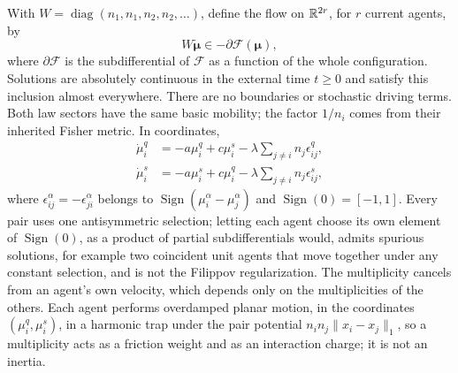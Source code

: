 With $W=\operatorname{diag}(n_1,n_1,n_2,n_2,\ldots)$, define the flow on
$\mathbb R^{2r}$, for $r$ current agents, by
\begin{equation}
 W\dot{\boldsymbol\mu}\in-\partial\mathcal F(\boldsymbol\mu),
 \label{fus:inclusion}
\end{equation}
where $\partial\mathcal F$ is the subdifferential of $\mathcal F$ as a
function of the whole configuration. Solutions are absolutely continuous in
the external time $t\geq0$ and satisfy this inclusion almost everywhere.
There are no boundaries or stochastic driving terms. Both law sectors have
the same basic mobility; the factor $1/n_i$ comes from their inherited Fisher
metric. In coordinates,
\begin{align}
 \dot\mu_i^q&=-a\mu_i^q+c\mu_i^s
 -\lambda\sum_{j\ne i}n_j\epsilon_{ij}^q,\\
 \dot\mu_i^s&=-a\mu_i^s+c\mu_i^q
 -\lambda\sum_{j\ne i}n_j\epsilon_{ij}^s,
 \label{fus:coordinate-flow}
\end{align}
where $\epsilon_{ij}^\alpha=-\epsilon_{ji}^\alpha$ belongs to
$\operatorname{Sign}(\mu_i^\alpha-\mu_j^\alpha)$ and
$\operatorname{Sign}(0)=[-1,1]$. Every pair uses one antisymmetric selection;
letting each agent choose its own element of $\operatorname{Sign}(0)$, as a
product of partial subdifferentials would, admits spurious solutions, for
example two coincident unit agents that move together under any constant
selection, and is not the Filippov regularization. The multiplicity cancels
from an agent's own velocity, which depends only on the multiplicities of the
others. Each agent performs overdamped planar motion, in the coordinates
$(\mu_i^q,\mu_i^s)$, in a harmonic trap under the pair potential
$n_in_j\|x_i-x_j\|_1$, so a multiplicity acts as a friction weight and as an
interaction charge; it is not an inertia.

